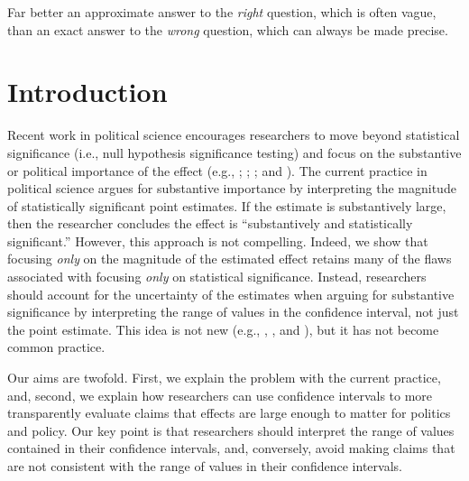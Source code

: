 \documentclass[12pt]{article}
\begin{document}
\epigraph{Far better an approximate answer to the \textit{right} question, which is often vague, than an exact answer to the \textit{wrong} question, which can always be made precise.}{\citet[pp. 13-14]{Tukey1962}}

\thispagestyle{empty}

\newpage
\doublespace

\section*{Introduction}

Recent work in political science encourages researchers to move beyond statistical significance (i.e., null hypothesis significance testing) and focus on the substantive or political importance of the effect (e.g., \citealt{KingTomzWittenberg2000}; \citealt{HanmerKalkan2013}; \citealt{EsareyDanneman2014}; and \citealt{Gross2014}). The current practice in political science argues for substantive importance by interpreting the magnitude of statistically significant point estimates. If the estimate is substantively large, then the researcher concludes the effect is ``substantively and statistically significant.'' However, this approach is not compelling. Indeed, we show that focusing \emph{only} on the magnitude of the estimated effect retains many of the flaws associated with focusing \emph{only} on statistical significance. Instead, researchers should account for the uncertainty of the estimates when arguing for substantive significance by interpreting the range of values in the confidence interval, not just the point estimate. This idea is not new (e.g., \citealt{Achen1982}, \citealt{Gross2014}, and \citealt{Rainey2014a}), but it has not become common practice. 

Our aims are twofold. First, we explain the problem with the current practice, and, second, we explain how researchers can use confidence intervals to more transparently evaluate claims that effects are large enough to matter for politics and policy. Our key point is that researchers should interpret the range of values contained in their confidence intervals, and, conversely, avoid making claims that are not consistent with the range of values in their confidence intervals.
\end{document}
